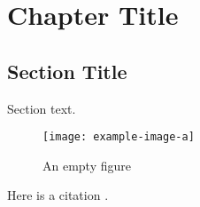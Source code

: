 
\chapter{Chapter Title} \label{chap:1}

    \section{Section Title}
    
        Section text.
        
            \begin{figure}[h]
                \centering
                \texttt{[image: example-image-a]}
                \caption{An empty figure}
                \label{fig:empty-figure}
            \end{figure}
            
        Here is a citation \cite{Gunn:2001}.